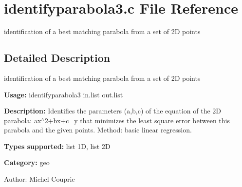 \section{identifyparabola3.c File Reference}
\label{identifyparabola3_8c}
identification of a best matching parabola from a set of 2D points  




\label{_details}
\subsection{Detailed Description}
identification of a best matching parabola from a set of 2D points 

{\bf Usage:} identifyparabola3 in.list out.list

{\bf Description:} Identifies the parameters (a,b,c) of the equation of the 2D parabola: ax$^\wedge$2+bx+c=y that minimizes the least square error between this parabola and the given points. Method: basic linear regression.

{\bf Types supported:} list 1D, list 2D

{\bf Category:} geo

\begin{Desc}
\item[Author:]Michel Couprie \end{Desc}
